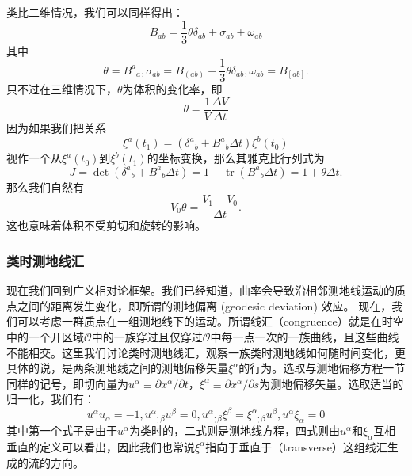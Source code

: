 \documentclass[hyperref, UTF8, a4paper]{ctexart}
\begin{document}
类比二维情况，我们可以同样得出：
\begin{equation*}
B_{ab} =\frac{1}{3} \theta \delta _{ab} +\sigma _{ab} +\omega _{ab}
\end{equation*}
其中
\begin{equation*}
\theta =B^{a}{}_{a} ,\sigma _{ab} =B_{( ab)} -\frac{1}{3} \theta \delta _{ab} ,\omega _{ab} =B_{[ ab]} .
\end{equation*}
只不过在三维情况下，$\theta $为体积的变化率，即
\begin{equation*}
\theta =\frac{1}{V}\frac{\Delta V}{\Delta t}
\end{equation*}
因为如果我们把关系
\begin{equation*}
\xi ^{a}( t_{1}) =(\delta ^{a}{}_{b} +B^{a}{}_{b} \Delta t)\xi ^{b}( t_{0})
\end{equation*}
视作一个从$\xi ^{a}( t_{0})$到$\xi ^{b}( t_{1})$的坐标变换，那么其雅克比行列式为
\begin{equation*}
J=\det (\delta ^{a}{}_{b} +B^{a}{}_{b} \Delta t)=1+\operatorname{tr} (B^{a}{}_{b} \Delta t)=1+\theta \Delta t.
\end{equation*}
那么我们自然有
\begin{equation*}
V_{0} \theta =\frac{V_{1} -V_{0}}{\Delta t} .
\end{equation*}
这也意味着体积不受剪切和旋转的影响。

\subsubsection{类时测地线汇}

现在我们回到广义相对论框架。我们已经知道，曲率会导致沿相邻测地线运动的质点之间的距离发生变化，即所谓的测地偏离 (geodesic deviation) 效应。 现在，我们可以考虑一群质点在一组测地线下的运动。所谓线汇（congruence）就是在时空中的一个开区域$\mathscr{O}$中的一族穿过且仅穿过$\mathscr{O}$中每一点一次的一族曲线，且这些曲线不能相交。这里我们讨论类时测地线汇，观察一族类时测地线如何随时间变化，更具体的说，是两条测地线之间的测地偏移矢量$\xi ^{\alpha }$的行为。选取与测地偏移方程一节同样的记号，即切向量为$u^{\alpha } \equiv \partial x^{\alpha } /\partial t$，$\xi ^{\alpha } \equiv \partial x^{\alpha } /\partial s$为测地偏移矢量。选取适当的归一化，我们有：
\begin{equation*}
	u^{\alpha } u_{\alpha } =-1,u^{\alpha }{}_{;\beta } u^{\beta } =0,u^{\alpha }{}_{;\beta } \xi ^{\beta } =\xi ^{\alpha }{}_{;\beta } u^{\beta } ,u^{\alpha } \xi _{\alpha } =0
\end{equation*}
其中第一个式子是由于$u^{\alpha }$为类时的，二式则是测地线方程，四式则由$u^{\alpha }$和$\xi _{\alpha }$互相垂直的定义可以看出，因此我们也常说$\xi ^{\alpha }$指向于垂直于（transverse）这组线汇生成的流的方向。
\end{document}
